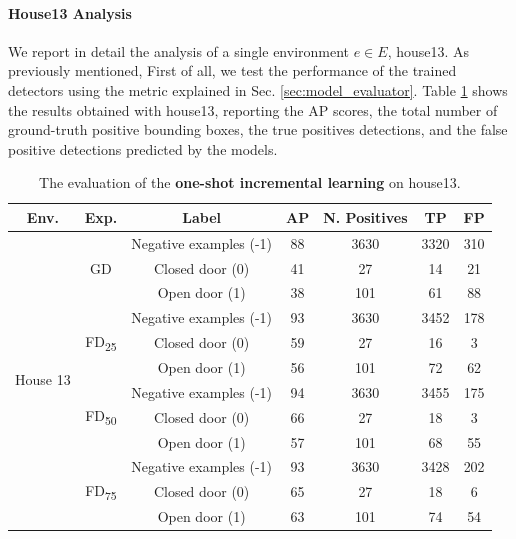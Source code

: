 \paragraph{House13 Analysis}

We report in detail the analysis of a single environment $e\in E$, house13. As previously mentioned,  First of all, we test the performance of the trained detectors using the metric explained in Sec. \ref{sec:model_evaluator}. Table \ref{tab:house13_results} shows the results obtained with house13, reporting the AP scores, the total number of ground-truth positive bounding boxes, the true positives detections, and the false positive detections predicted by the models. 

\begin{table}[h!]
	\centering
	\begin{tabular}{ccccccc}
		
		\toprule
		\textbf{Env.} & \textbf{Exp.} & \textbf{Label} & \textbf{AP} & \textbf{N. Positives} & \textbf{TP} & \textbf{FP} \\
		\midrule
		\multicolumn{1}{c|}{\multirow{12}{*}{House 13}} & \multicolumn{1}{c|}{\multirow{3}{*}{\textsf{GD}}} & Negative examples (-1) & 88 & 3630 & 3320 & 310  \tabularnewline 
		\multicolumn{1}{c|}{}& \multicolumn{1}{c|}{} & Closed door (0) & 41 & 27 & 14 & 21  \\
		\multicolumn{1}{c|}{}& \multicolumn{1}{c|}{}& Open door (1) & 38 & 101 & 61 & 88  \\  \cline{2-7}
		\multicolumn{1}{c|}{}& \multicolumn{1}{c|}{\multirow{3}{*}{\textsf{FD\textsubscript{25}}}} & Negative examples (-1) & 93 & 3630 & 3452 & 178  \tabularnewline [1pt]
		\multicolumn{1}{c|}{}& \multicolumn{1}{c|}{} & Closed door (0) & 59 & 27 & 16 & 3  \\ 
		\multicolumn{1}{c|}{}& \multicolumn{1}{c|}{} & Open door (1) & 56 & 101 & 72 & 62   \\ \cline{2-7}
		\multicolumn{1}{c|}{} & \multicolumn{1}{c|}{\multirow{3}{*}{\textsf{FD\textsubscript{50}}}} & Negative examples (-1) & 94 & 3630 & 3455 & 175  \tabularnewline 
		\multicolumn{1}{c|}{}& \multicolumn{1}{c|}{} & Closed door (0) & 66 & 27 & 18 & 3  \\
		\multicolumn{1}{c|}{}& \multicolumn{1}{c|}{}& Open door (1) & 57 & 101 & 68 & 55  \\  \cline{2-7}
		\multicolumn{1}{c|}{}& \multicolumn{1}{c|}{\multirow{3}{*}{\textsf{FD\textsubscript{75}}}} & Negative examples (-1) & 93 & 3630 & 3428 & 202  \tabularnewline [1pt]
		\multicolumn{1}{c|}{}& \multicolumn{1}{c|}{} & Closed door (0) & 65 & 27 & 18 & 6  \\ 
		\multicolumn{1}{c|}{}& \multicolumn{1}{c|}{} & Open door (1) & 63 & 101 & 74 & 54   \\ 
		\bottomrule
	\end{tabular}
	\caption{The evaluation of the \textbf{one-shot incremental learning} on house13.}
	\label{tab:house13_results}
\end{table}

